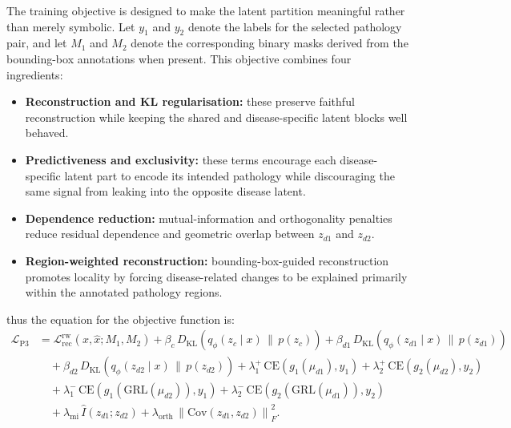 The training objective is designed to make the latent partition meaningful rather than merely symbolic.
Let $y_1$ and $y_2$ denote the labels for the selected pathology pair, and let $M_1$ and $M_2$ denote the corresponding binary masks derived from the bounding-box annotations when present.
This objective combines four ingredients:
\begin{itemize}
    \item \textbf{Reconstruction and KL regularisation:} these preserve faithful reconstruction while keeping the shared and disease-specific latent blocks well behaved.

    \item \textbf{Predictiveness and exclusivity:} these terms encourage each disease-specific latent part to encode its intended pathology while discouraging the same signal from leaking into the opposite disease latent.

    \item \textbf{Dependence reduction:} mutual-information and orthogonality penalties reduce residual dependence and geometric overlap between $z_{d1}$ and $z_{d2}$.

    \item \textbf{Region-weighted reconstruction:} bounding-box-guided reconstruction promotes locality by forcing disease-related changes to be explained primarily within the annotated pathology regions.
\end{itemize}
thus the equation for the objective function is:
\begin{equation}
\begin{aligned}
\mathcal{L}_{\mathrm{P3}}
&=
\mathcal{L}_{\mathrm{rec}}^{\mathrm{rw}}(x,\hat{x};M_1,M_2)
+ \beta_c \, D_{\mathrm{KL}}\!\left(q_\phi(z_c \mid x)\,\|\,p(z_c)\right)
+ \beta_{d1} \, D_{\mathrm{KL}}\!\left(q_\phi(z_{d1} \mid x)\,\|\,p(z_{d1})\right) \\
&\quad
+ \beta_{d2} \, D_{\mathrm{KL}}\!\left(q_\phi(z_{d2} \mid x)\,\|\,p(z_{d2})\right)
+ \lambda^{+}_{1}\,\mathrm{CE}\!\left(g_{1}(\mu_{d1}), y_{1}\right)
+ \lambda^{+}_{2}\,\mathrm{CE}\!\left(g_{2}(\mu_{d2}), y_{2}\right) \\
&\quad
+ \lambda^{-}_{1}\,\mathrm{CE}\!\left(g_{1}(\mathrm{GRL}(\mu_{d2})), y_{1}\right)
+ \lambda^{-}_{2}\,\mathrm{CE}\!\left(g_{2}(\mathrm{GRL}(\mu_{d1})), y_{2}\right) \\
&\quad
+ \lambda_{\mathrm{mi}} \, \hat{I}(z_{d1}; z_{d2})
+ \lambda_{\mathrm{orth}} \, \left\lVert \mathrm{Cov}(z_{d1}, z_{d2}) \right\rVert_F^2 .
\end{aligned}
\end{equation}
